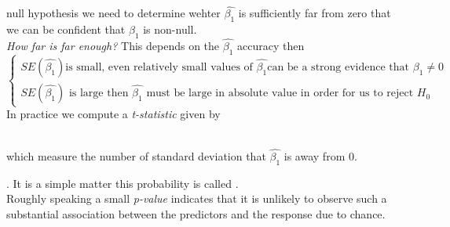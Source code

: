 null hypothesis we need to determine wehter $\widehat{\beta_{1}}$ is
sufficiently
far from zero that we can be confident that $\beta_{1}$ is non-null.\\
\emph{How far is far enough?} This depends on the $\widehat{\beta_{1}}$
accuracy then \\$\begin{cases}SE\left(\widehat{\beta_{1}}\right)\text{
is small, even relatively small values of }\widehat{\beta_{1}}\text{
can be a strong evidence that }\beta_{1}\neq 0\\SE\left(\widehat{
\beta_{1}}\right)\text{ is large then }\widehat{\beta_{1}}\text{ must 
be large in absolute value in order for us to reject }H_{0}\end{cases}$
\\In practice we compute a \emph{t-statistic} given by \begin{center}
\\which measure the number of standard deviation that $
\widehat{\beta_{1}}$ is away from $0$.\end{center} . It is a simple matter  this probability is called
.\\Roughly speaking a small \emph{p-value} indicates
that it is unlikely to observe such a substantial association between
the predictors and the response due to chance.\\
